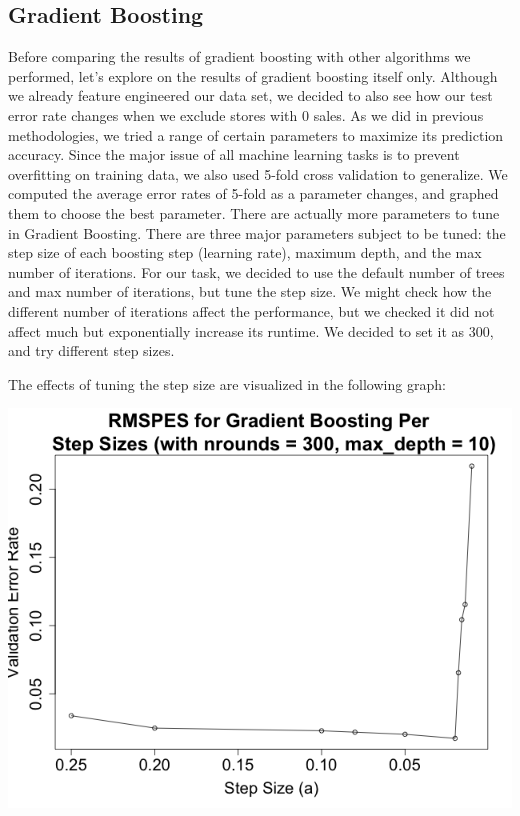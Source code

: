 \documentclass[letterpaper,twocolumn,11pt]{article}
\begin{document}
\subsection{Gradient Boosting}
Before comparing the results of gradient boosting with other algorithms we performed, let's explore on the results of gradient boosting itself only. Although we already feature engineered our data set, we decided to also see how our test error rate changes when we exclude stores with 0 sales. As we did in previous methodologies, we tried a range of certain parameters to maximize its prediction accuracy. Since the major issue of all machine learning tasks is to prevent overfitting on training data, we also used 5-fold cross validation to generalize. We computed the average error rates of 5-fold as a parameter changes, and graphed them to choose the best parameter. There are actually more parameters to tune in Gradient Boosting. There are three major parameters subject to be tuned: the step size of each boosting step (learning rate), maximum depth, and the max number of iterations. For our task, we decided to use the default number of trees and max number of iterations, but tune the step size. We might check how the different number of iterations affect the performance, but we checked it did not affect much but exponentially increase its runtime. We decided to set it as 300, and try different step sizes. 

The effects of tuning the step size are visualized in the following graph:

\includegraphics[scale=0.33]{img/gb_rmpse.png}
\end{document}
